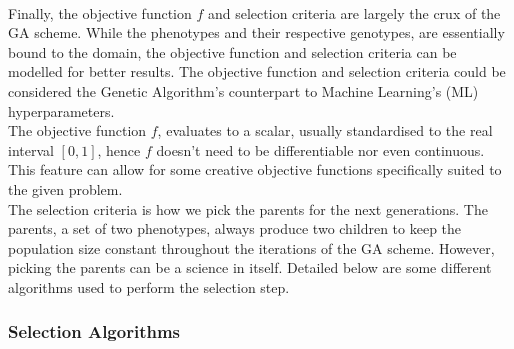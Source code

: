 \\
Finally, the objective function $f$ and selection criteria are largely the crux of the GA scheme. While the phenotypes and their respective genotypes, are essentially bound to the domain, the objective function and selection criteria can be modelled for better results. The objective function and selection criteria could be considered the Genetic Algorithm's counterpart to Machine Learning's (ML) hyperparameters.
\\
The objective function $f$, evaluates to a scalar, usually standardised to the real interval $[0,1]$, hence $f$ doesn't need to be differentiable nor even continuous. This feature can allow for some creative objective functions specifically suited to the given problem.
\\
The selection criteria is how we pick the parents for the next generations. The parents, a set of two phenotypes, always produce two children to keep the population size constant throughout the iterations of the GA scheme. However, picking the parents can be a science in itself. Detailed below are some different algorithms used to perform the selection step.

\subsubsection{Selection Algorithms}
